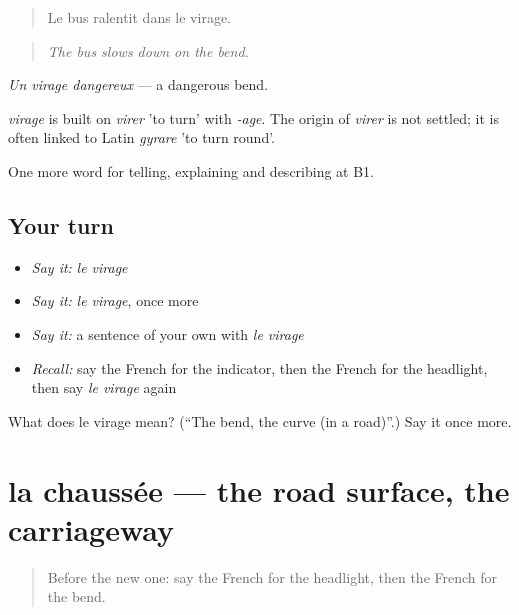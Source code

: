 \begin{quote}
Le bus ralentit dans le virage.
\end{quote}

\begin{quote}
\emph{The bus slows down on the bend.}
\end{quote}

\emph{Un virage dangereux} — a dangerous bend.

\begin{cousinweb}
\emph{virage} is built on \emph{virer} 'to turn' with \emph{-age}. The origin of \emph{virer} is not settled; it is often linked to Latin \emph{gyrare} 'to turn round'.
\end{cousinweb}

\begin{grammarlens}[title={What you've built}]
One more word for telling, explaining and describing at B1.
\end{grammarlens}

\subsection*{Your turn}
\begin{itemize}
\raggedright
  \item \emph{Say it:} \emph{le virage}
  \item \emph{Say it:} \emph{le virage}, once more
  \item \emph{Say it:} a sentence of your own with \emph{le virage}
  \item \emph{Recall:} say the French for the indicator, then the French for the headlight, then say \emph{le virage} again
\end{itemize}

\begin{tcolorbox}[breakable,colback=teal!4,colframe=teal!35!black,title={Before you move on}]
What does le virage mean? (\textquotedblleft{}The bend, the curve (in a road)\textquotedblright{}.) Say it once more.
\end{tcolorbox}
\section[la chaussée]{la chaussée — the road surface, the carriageway}

\label{lesson:FR-C409-chaussee}



\begin{quote}
Before the new one: say the French for the headlight, then the French for the bend.
\end{quote}

